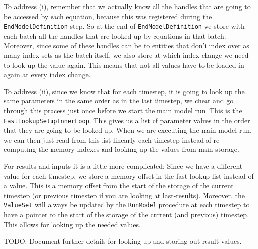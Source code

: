 \documentclass[11pt]{article}
\theoremstyle{definition}
\begin{document}
To address (i), remember that we actually know all the handles that are going to be accessed by each equation, because this was registered during the {\tt EndModelDefinition} step. So at the end of {\tt EndModelDefinition} we store with each batch all the handles that are looked up by equations in that batch. Moreover, since some of these handles can be to entities that don't index over as many index sets as the batch itself, we also store at which index change we need to look up the value again. This means that not all values have to be loaded in again at every index change.

To address (ii), since we know that for each timestep, it is going to look up the same parameters in the same order as in the last timestep, we cheat and go through this process just once before we start the main model run. This is the {\tt FastLookupSetupInnerLoop}. This gives us a list of parameter values in the order that they are going to be looked up. When we are executing the main model run, we can then just read from this list linearly each timestep instead of re-computing the memory indexes and looking up the values from main storage.

For results and inputs it is a little more complicated: Since we have a different value for each timestep, we store a memory offset in the fast lookup list instead of a value. This is a memory offset from the start of the storage of the current timestep (or previous timestep if you are looking at last-results). Moreover, the {\tt ValueSet} will always be updated by the {\tt RunModel} procedure at each timestep to have a pointer to the start of the storage of the current (and previous) timestep. This allows for looking up the needed values.

TODO: Document further details for looking up and storing out result values.
\end{document}
